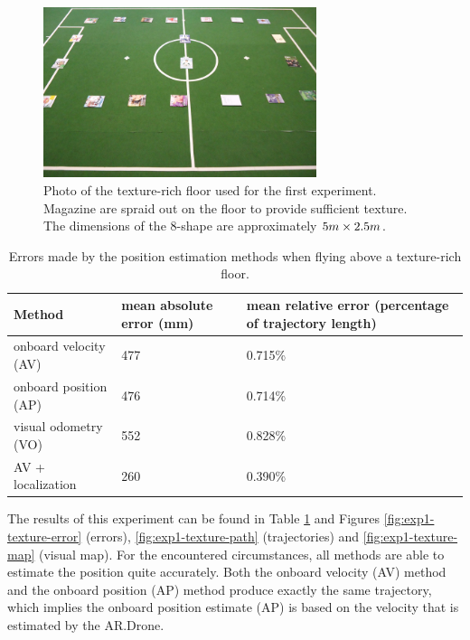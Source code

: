 \begin{figure}[htb!]
\centering
\includegraphics[width=8cm]{images/exp1-floor.jpg}
\caption{Photo of the texture-rich floor used for the first experiment. Magazine are spraid out on the floor to provide sufficient texture. The dimensions of the 8-shape are approximately $5\small{m} \times 2.5\small{m}$.}
\label{fig:exp1-floor}
\end{figure}

\begin{table}[htb!]
    \centering
    \begin{tabular}
        { | l | l | l | } 
	\hline
	Method & mean absolute error (\small{mm}) & mean relative error (percentage of trajectory length) \\
        \hline
        onboard velocity (AV) & 477 & 0.715\% \\
	onboard position (AP) & 476 & 0.714\% \\
	visual odometry (VO) & 552 & 0.828\% \\
	AV + localization & 260 & 0.390\% \\
	\hline
    \end{tabular}
    \caption{Errors made by the position estimation methods when flying above a texture-rich floor.}
    \label{tab:res_mapping}
\end{table}

The results of this experiment can be found in Table \ref{tab:res_mapping} and Figures \ref{fig:exp1-texture-error} (errors), \ref{fig:exp1-texture-path} (trajectories) and \ref{fig:exp1-texture-map} (visual map).
For the encountered circumstances, all methods are able to estimate the position quite accurately.
Both the onboard velocity (AV) method and the onboard position (AP) method produce exactly the same trajectory, which implies the onboard position estimate (AP) is based on the velocity that is estimated by the AR.Drone.

